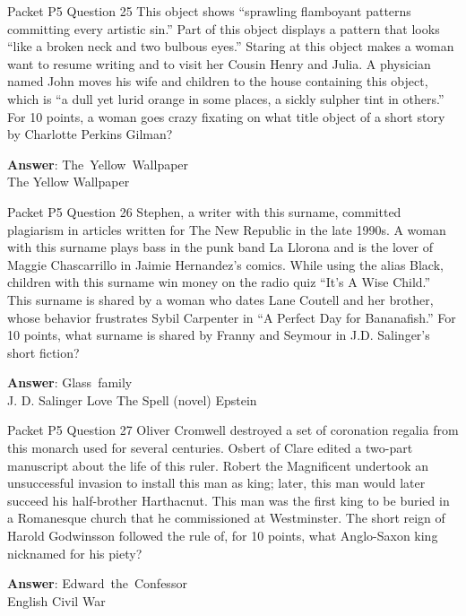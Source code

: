 \begin{frame}{Packet P5 Question 25}
This object shows “sprawling flamboyant patterns committing every artistic sin.” Part of this object displays a pattern that looks ``like a broken neck and two bulbous eyes.'' Staring at this object makes a woman want to resume writing and to visit her Cousin Henry   and Julia. A physician named John moves   his wife and children to the house containing this object, which is “a dull yet lurid orange in some places, a sickly sulpher tint in others.” For 10 points, a woman goes crazy fixating on what title object of a short story by Charlotte Perkins   Gilman?  

\textbf{Answer}: The\ Yellow\ Wallpaper\\
 The Yellow Wallpaper
\end{frame}

\begin{frame}{Packet P5 Question 26}
Stephen, a writer with this surname, committed plagiarism in articles written for The New Republic in the late 1990s. A woman with this surname plays bass in the punk band La Llorona and is the lover of Maggie Chascarrillo in Jaimie Hernandez's comics. While using the alias Black, children with this surname win money on the radio quiz “It’s A Wise Child.” This surname is shared by a woman who dates Lane Coutell and her brother, whose behavior frustrates Sybil Carpenter in ``A Perfect Day for Bananafish.'' For 10 points,   what surname is shared by Franny and Seymour in J.D. Salinger's short fiction?      

\textbf{Answer}: Glass\ family\\
 J. D. Salinger
 Love
 The Spell (novel)
 Epstein
\end{frame}

\begin{frame}{Packet P5 Question 27}
Oliver Cromwell destroyed   a set of coronation regalia from this monarch used for several centuries. Osbert of Clare edited a two-part manuscript about the life of this ruler. Robert the Magnificent undertook an unsuccessful invasion to install this man as king; later, this man would later succeed his half-brother Harthacnut. This man was the     first king to be buried in a Romanesque church that he commissioned at Westminster. The short reign of Harold Godwinsson   followed the rule of, for 10 points, what Anglo-Saxon king nicknamed for his   piety?

\textbf{Answer}: Edward\ the\ Confessor\\
 English Civil War
\end{frame}


